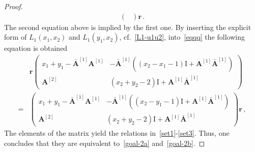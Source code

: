 \documentclass[10pt,a4paper]{amsart}
\newcommand{\ID}{\mathrm{I}}
\newcommand{\OA}{\mathbf{A}}
\newcommand{\OAD}{\mathbf{\bar{A}}}
\begin{document}
\begin{proof}
\begin{equation}
\begin{split}
\begin{pmatrix}
		\end{pmatrix}\mathbf{r}\,.
	\end{split}
\end{equation}
The second equation above is implied by the first one.
By inserting the explicit form of $L_{1}(x_{1},x_{2})$ and $L_{1}(y_{1},x_{2})$, cf.~\eqref{L1-u1u2}, into~\eqref{eqqq} the following equation is obtained
\begin{equation}\label{intermediate}
	\begin{split}
		&\mathbf{r} \left(\begin{array}{cc}
			x_{1}+y_{1}-\OAD^{[1]}\OA^{[1]}&-\OAD^{[1]}\left((x_{2}-x_{1}-1)\ID+\OA^{[1]}\OAD^{[1]}\right)\\
			\OA^{[2]}&(x_{2}+y_{2}-2)\ID+\OA^{[1]}\OAD^{[1]}
		\end{array}\right)
		\\=&
		\left(\begin{array}{cc}
			x_{1}+y_{1}-\OAD^{[1]}\OA^{[1]}&-\OAD^{[1]}\left((x_{2}-y_{1}-1)\ID+\OA^{[1]}\OAD^{[1]}\right)\\
			\OA^{[2]}&(x_{2}+y_{2}-2)\ID+\OA^{[1]}\OAD^{[1]}
		\end{array}\right)\mathbf{r}\,,
	\end{split}
\end{equation}
The elements of the matrix yield the relations in~\eqref{set1}-\eqref{set3}.
Thus, one concludes that they are equivalent to~\eqref{goal-2a} and~\eqref{goal-2b}. 

\end{proof}
\end{document}
